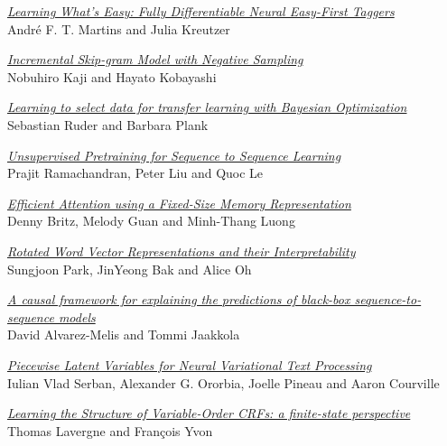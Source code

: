 \hyperlink{page.349}{\em Learning What's Easy: Fully Differentiable Neural Easy-First Taggers}\samepage \\
\hspace*{7mm} Andr\'{e} F. T. Martins and Julia Kreutzer\dotfill {}

\hyperlink{page.361}{\em Incremental Skip-gram Model with Negative Sampling}\samepage \\
\hspace*{7mm} Nobuhiro Kaji and Hayato Kobayashi\dotfill {}

\hyperlink{page.370}{\em Learning to select data for transfer learning with Bayesian Optimization}\samepage \\
\hspace*{7mm} Sebastian Ruder and Barbara Plank\dotfill {}

\hyperlink{page.381}{\em Unsupervised Pretraining for Sequence to Sequence Learning}\samepage \\
\hspace*{7mm} Prajit Ramachandran, Peter Liu and Quoc Le\dotfill {}

\hyperlink{page.390}{\em Efficient Attention using a Fixed-Size Memory Representation}\samepage \\
\hspace*{7mm} Denny Britz, Melody Guan and Minh-Thang Luong\dotfill {}

\hyperlink{page.399}{\em Rotated Word Vector Representations and their Interpretability}\samepage \\
\hspace*{7mm} Sungjoon Park, JinYeong Bak and Alice Oh\dotfill {}

\hyperlink{page.410}{\em A causal framework for explaining the predictions of black-box sequence-to-sequence models}\samepage \\
\hspace*{7mm} David Alvarez-Melis and Tommi Jaakkola\dotfill {}

\hyperlink{page.420}{\em Piecewise Latent Variables for Neural Variational Text Processing}\samepage \\
\hspace*{7mm} Iulian Vlad Serban, Alexander G. Ororbia, Joelle Pineau and Aaron Courville\dotfill {}

\hyperlink{page.431}{\em Learning the Structure of Variable-Order CRFs: a finite-state perspective}\samepage \\
\hspace*{7mm} Thomas Lavergne and Fran\c{c}ois Yvon\dotfill {}


